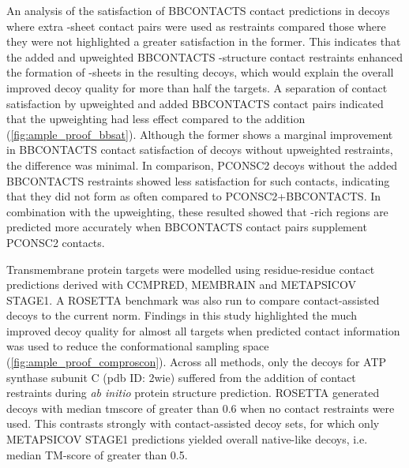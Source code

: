 An analysis of the satisfaction of BBCONTACTS contact predictions in decoys where extra \textbeta-sheet contact pairs were used as restraints compared those where they were not highlighted a greater satisfaction in the former. This indicates that the added and upweighted BBCONTACTS \textbeta-structure contact restraints enhanced the formation of \textbeta-sheets in the resulting decoys, which would explain the overall improved decoy quality for more than half the targets. A separation of contact satisfaction by upweighted and added BBCONTACTS contact pairs indicated that the upweighting had less effect compared to the addition (\cref{fig:ample_proof_bbsat}). Although the former shows a marginal improvement in BBCONTACTS contact satisfaction of decoys without upweighted restraints, the difference was minimal. In comparison, PCONSC2 decoys without the added BBCONTACTS restraints showed less satisfaction for such contacts, indicating that they did not form as often compared to PCONSC2+BBCONTACTS. In combination with the upweighting, these resulted showed that \textbeta-rich regions are predicted more accurately when BBCONTACTS contact pairs supplement PCONSC2 contacts.

Transmembrane protein targets were modelled using residue-residue contact predictions derived with CCMPRED, MEMBRAIN and METAPSICOV STAGE1. A ROSETTA benchmark was also run to compare contact-assisted decoys to the current norm. Findings in this study highlighted the much improved decoy quality for almost all targets when predicted contact information was used to reduce the conformational sampling space (\cref{fig:ample_proof_comproscon}). Across all methods, only the decoys for ATP synthase subunit C (\gls{pdb} ID: 2wie) suffered from the addition of contact restraints during \textit{ab initio} protein structure prediction. ROSETTA generated decoys with median \gls{tmscore} of greater than 0.6 when no contact restraints were used. This contrasts strongly with contact-assisted decoy sets, for which only METAPSICOV STAGE1 predictions yielded overall native-like decoys, i.e. median TM-score of greater than 0.5. 

